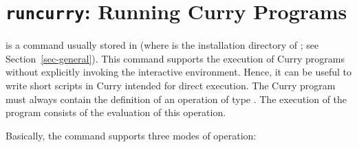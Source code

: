 \section{\texttt{runcurry}: Running Curry Programs}

is a command usually stored in 
(where \cyshome is the installation directory of \CYS;
see Section~\ref{sec-general}).
This command supports the execution of Curry programs
without explicitly invoking the interactive environment.
Hence, it can be useful to write short scripts in Curry
intended for direct execution.
The Curry program must always contain the definition of an operation
 of type .
The execution of the program consists of the evaluation of this operation.

Basically, the command  supports three modes of operation:
